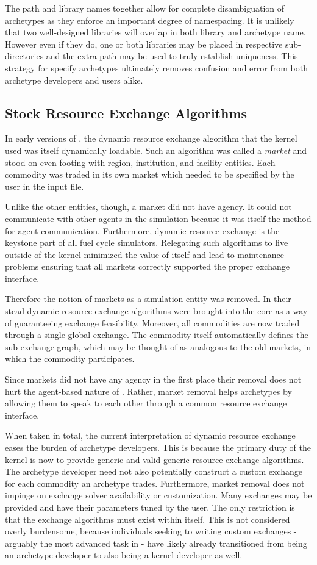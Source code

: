 The path and library names together allow for complete disambiguation of 
archetypes as they enforce an important degree of namespacing.  It is unlikely
that two well-designed libraries will overlap in both library and archetype name.
However even if they do, one or both libraries may be placed in respective
sub-directories and the extra path may be used to truly establish uniqueness.
This strategy for specify archetypes ultimately removes confusion and error from 
both archetype developers and users alike.

\subsection{Stock Resource Exchange Algorithms}

In early versions of \cyclus, the dynamic resource exchange algorithm that the 
kernel used was itself dynamically loadable. Such an algorithm was called a
\emph{market} and stood on even footing with region, institution, and facility 
entities. Each commodity was traded in its own market which needed to be specified by 
the user in the input file.

Unlike the other entities, though, a market did not have agency.  It could not 
communicate with other agents in the simulation because it was itself the method
for agent communication.  Furthermore, dynamic resource exchange is the keystone
part of all fuel cycle simulators.  Relegating such algorithms to live outside of 
the kernel minimized the value of \cyclus itself and lead to maintenance problems 
ensuring that all markets correctly supported the proper exchange interface.

Therefore the notion of markets as a simulation entity was removed. In their stead
dynamic resource exchange algorithms were brought into the core as a way of 
guaranteeing exchange feasibility. Moreover, all commodities are now traded through a
single global exchange. The commodity itself automatically defines the sub-exchange 
graph, which may be thought of as analogous to the old markets, in which
the commodity participates.

Since markets did not have any agency in the first place their removal does not 
hurt the agent-based
nature of \cyclus.  Rather, market removal helps archetypes by allowing them to 
speak to each other through a common resource exchange interface.

When taken in total, the current interpretation of dynamic resource exchange 
eases the burden of archetype developers. This is because the primary duty of the 
kernel is now to provide generic and valid generic resource exchange algorithms.
The archetype developer need not also potentially construct a custom exchange for 
each commodity an archetype trades. Furthermore, market removal does not 
impinge on exchange solver availability or customization.  Many exchanges may 
be provided and have their parameters tuned by the user.  The only restriction 
is that the exchange algorithms must exist within \cyclus itself.  This is not 
considered overly burdensome, because individuals seeking to writing custom 
exchanges - arguably the most advanced task in \cyclus - have likely already 
transitioned from being an archetype developer to also being a kernel developer
as well.
